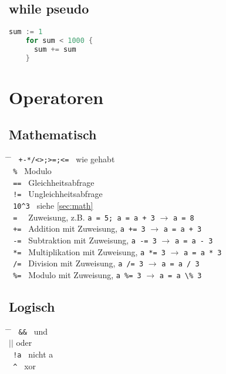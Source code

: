 \documentclass[twoside,a4paper,12pt]{article}
\begin{document}
\subsection{while pseudo}
\begin{center}
  \begin{minipage}{1.0\textwidth}
    \begin{lstlisting}[language=Go]
    sum := 1 
    for sum < 1000 { 
      sum += sum
    }
    \end{lstlisting}
  \end{minipage}
\end{center}

\section{Operatoren}
\subsection{Mathematisch}
\begin{tabbing}
 \hspace{2mm} \= \hspace{30mm} \= \kill
 \> \verb| +-*/<>;>=;<= | \> wie gehabt \\ 
 \> \verb| % |\> Modulo \\ 
 \> \verb| == | \> Gleichheitsabfrage \\ 
 \> \verb| != | \> Ungleichheitsabfrage \\ 
 \> \verb| 10^3 | \> siehe \ref{sec:math} \\
 \> \verb| =  | \> Zuweisung, z.B. \verb|a = 5; a = a + 3| $\rightarrow$ \verb|a = 8| \\ 
 \> \verb| += | \> Addition mit Zuweisung, \verb|a += 3| $\rightarrow$ \verb|a = a + 3| \\ 
 \> \verb| -= | \> Subtraktion mit Zuweisung, \verb|a -= 3| $\rightarrow$ \verb|a = a - 3| \\ 
 \> \verb| *= | \> Multiplikation mit Zuweisung, \verb|a *= 3| $\rightarrow$ \verb|a = a * 3| \\ 
 \> \verb| /= | \> Division mit Zuweisung, \verb|a /= 3| $\rightarrow$ \verb|a = a / 3| \\ 
 \> \verb| %= | \> Modulo mit Zuweisung, \verb|a %= 3| $\rightarrow$ \verb|a = a \% 3| \\
\end{tabbing}
\subsection{Logisch}
\begin{tabbing}
 \hspace{2mm} \= \hspace{30mm} \= \kill
  \> \verb| && | \> und \\ 
  \> \hspace{1mm}  $||$ \> oder \\ 
  \> \verb| !a | \> nicht a \\
  \> \verb| ^ | \> xor \\
\end{tabbing}
\end{document}
